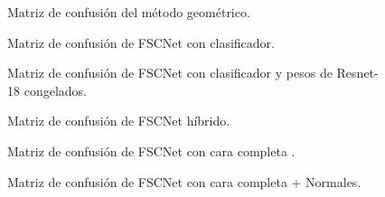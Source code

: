 \begin{appendices}
\begin{figure}[h]
\noindent
{}
\caption{Matriz de confusión del método geométrico.}
\label{fig:mc_geometrico}
\end{figure}

\begin{figure}[h]
\noindent
{}
\caption{Matriz de confusión  de FSCNet con clasificador.}
\label{fig:mc_clas}
\end{figure}


\begin{figure}[h]
\noindent
{}
\caption{Matriz de confusión de FSCNet con clasificador y pesos de Resnet-18 congelados.}
\label{fig:mc_clas_cong}
\end{figure}

\begin{figure}[h]
\noindent
{}
\caption{Matriz de confusión de FSCNet híbrido.}
\label{fig:mc_hibrido}
\end{figure}

\begin{figure}[h]
\noindent
{}
\caption{Matriz de confusión de FSCNet con cara completa .}
\label{fig:mc_cara}
\end{figure}

\begin{figure}[h]
\noindent
{}
\caption{Matriz de confusión de FSCNet con cara completa + Normales.}
\label{fig:mc_cara_normal}
\end{figure}
\end{appendices}